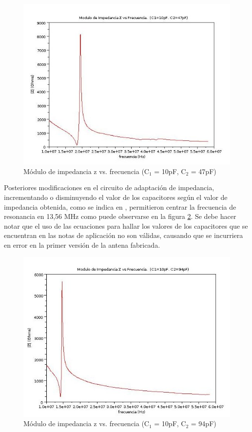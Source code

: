 \begin{figure}[H]
\centering
  \begin{center}
  \includegraphics[scale=.45]{Imagenes/match47_L.jpg}
  \end{center}
  \caption{Módulo de impedancia z vs. frecuencia (C$_{1}$ = 10pF, C$_{2}$ = 47pF)}\label{Fig:18M} 
\end{figure}

Posteriores modificaciones en el circuito de adaptación de impedancia, incrementando o disminuyendo el valor de los capacitores según el valor de impedancia obtenida, como se indica en \cite{MRICF},  permitieron centrar la frecuencia de resonancia en 13,56 MHz como puede observarse en la figura \ref{Fig:1356M}. Se debe hacer notar que el uso de las ecuaciones para hallar los valores de los capacitores que se encuentran en las notas de aplicación \cite{MRICF} no son válidas, causando que se incurriera en error en la primer versión de la antena fabricada.  

\begin{figure}[H]
\centering
  \begin{center}
  \includegraphics[scale=.45]{Imagenes/match94_L.jpg}
  \end{center}
  \caption{Módulo de impedancia z vs. frecuencia (C$_{1}$ = 10pF, C$_{2}$ = 94pF)}\label{Fig:1356M} 
\end{figure}


